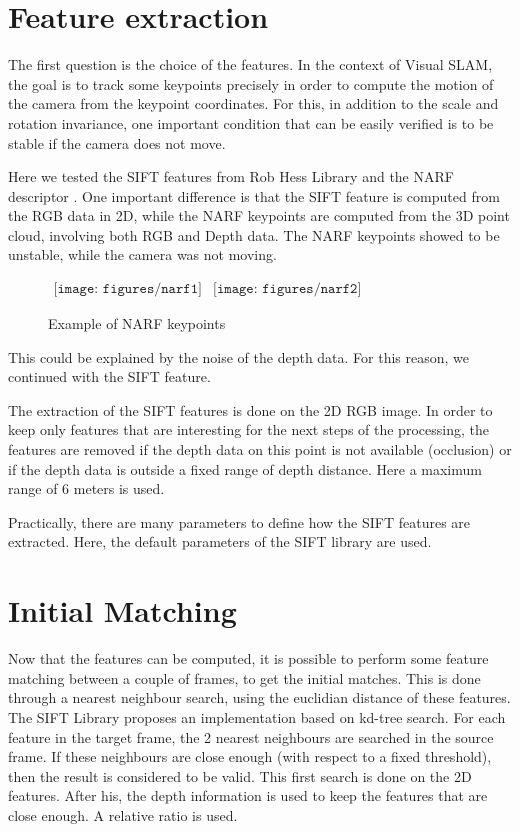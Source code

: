 \section{Feature extraction}

The first question is the choice of the features. In the context of Visual SLAM, the goal is to track some keypoints precisely in order to compute the motion of the camera from the keypoint coordinates. For this, in addition to the scale and rotation invariance, one important condition that can be easily verified is to be stable if the camera does not move. 

Here we tested the SIFT features from Rob Hess Library \cite{hess_sift} and the NARF descriptor \cite{steder10irosws}. One important difference is that the SIFT feature is computed from the RGB data in 2D, while the NARF keypoints are computed from the 3D point cloud, involving both RGB and Depth data.
The NARF keypoints showed to be unstable, while the camera was not moving.

\begin{figure}[h]
\centering$
\begin{array}{cc}
\texttt{[image: figures/narf1]} &
\texttt{[image: figures/narf2]}
\end{array}$
\caption{Example of NARF keypoints}
\end{figure}

This could be explained by the noise of the depth data. For this reason, we continued with the SIFT feature.

The extraction of the SIFT features is done on the 2D RGB image. In order to keep only features that are interesting for the next steps of the processing, the features are removed if the depth data on this point is not available (occlusion) or if the depth data is outside a fixed range of depth distance. Here a maximum range of 6 meters is used.

Practically, there are many parameters to define how the SIFT features are extracted. Here, the default parameters of the SIFT library \cite{hess_sift} are used.

\section{Initial Matching}

Now that the features can be computed, it is possible to perform some feature matching between a couple of frames, to get the initial matches. This is done through a nearest neighbour search, using the euclidian distance of these features.  
The SIFT Library \cite{hess_sift} proposes an implementation based on kd-tree search. For each feature in the target frame, the 2 nearest neighbours are searched in the source frame. If these neighbours are close enough (with respect to a fixed threshold), then the result is considered to be valid. This first search is done on the 2D features.
After his, the depth information is used to keep the features that are close enough. A relative ratio is used.

